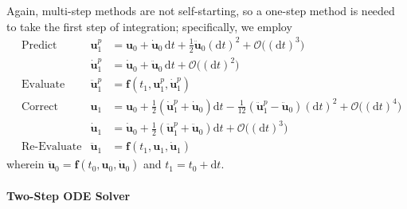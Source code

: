 Again, multi-step methods are not self-starting, so a one-step method is needed to take the first step of integration; specifically, we employ
\begin{subequations}
    \label{pairedStartUp}
    \begin{align}
    \mbox{} & \text{Predict} & 
    \mathbf{u}_1^p & = \mathbf{u}_0 + \dot{\mathbf{u}}_0 \, \mathrm{d}t +
    \tfrac{1}{2} \ddot{\mathbf{u}}_0 (\mathrm{d}t)^2 + \mathcal{O} \bigl( ( \mathrm{d}t )^3 \bigr)
    \label{startupDisplacementPredictor} \\
    \mbox{} & &
    \dot{\mathbf{u}}^p_1 & = 
    \dot{\mathbf{u}}_0 + \ddot{\mathbf{u}}_0 \, \mathrm{d}t + 
    \mathcal{O} \bigl( ( \mathrm{d}t )^2 \bigr) 
    \label{startUpVelocityPredictor} \\
    \mbox{} & \text{Evaluate} &
    \ddot{\mathbf{u}}^p_1 & = \mathbf{f} (t_1, \mathbf{u}^p_1, \dot{\mathbf{u}}^p_1)
    \label{startUpEvaluate} \\
    \mbox{} & \text{Correct} &
    \mathbf{u}_1 & = \mathbf{u}_0 + \tfrac{1}{2} 
    ( \dot{\mathbf{u}}^p_1 + \dot{\mathbf{u}}_0 ) \mathrm{d}t -
    \tfrac{1}{12} ( \ddot{\mathbf{u}}^p_1 - 
    \ddot{\mathbf{u}}_0 ) (\mathrm{d}t)^2 + \mathcal{O} \bigl( (\mathrm{d}t)^4 \bigr) 
    \label{startupDisplacementCorrector} \\
    \mbox{} & &
    \dot{\mathbf{u}}_1 & = \dot{\mathbf{u}}_0 + \tfrac{1}{2} 
    ( \ddot{\mathbf{u}}_1^p + \ddot{\mathbf{u}}_0 ) \mathrm{d}t + 
    \mathcal{O} \bigl( (\mathrm{d}t)^3 \bigr)
    \label{startUpVelocityCorrector} \\
    \mbox{} & \text{Re-Evaluate} &
    \ddot{\mathbf{u}}_1 & = \mathbf{f} (t_1, \mathbf{u}_1, \dot{\mathbf{u}}_1) 
    \label{startUpReEvaluate}
    \end{align}
\end{subequations}
wherein $\ddot{\mathbf{u}}_0 = \mathbf{f}(t_0, \mathbf{u}_0, \dot{\mathbf{u}}_0)$ and $t_1 = t_0 + \mathrm{d}t$. 


\paragraph{Two-Step ODE Solver}

